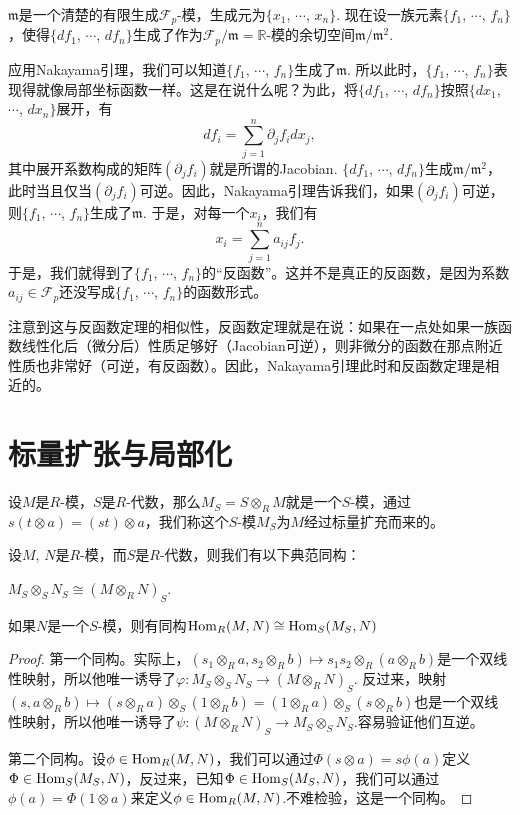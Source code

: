 $\mathfrak{m}$是一个清楚的有限生成$\mathcal{F}_p$-模，生成元为$\{x_1$, $\cdots$, $x_n\}$. 现在设一族元素$\{f_1$, $\cdots$, $f_n\}$，使得$\{df_1$, $\cdots$, $df_n\}$生成了作为$\mathcal{F}_p/\mathfrak{m}=\mathbb{R}$-模的余切空间$\mathfrak{m}/\mathfrak{m}^2$.

应用Nakayama引理，我们可以知道$\{f_1$, $\cdots$, $f_n\}$生成了$\mathfrak{m}$. 所以此时，$\{f_1$, $\cdots$, $f_n\}$表现得就像局部坐标函数一样。这是在说什么呢？为此，将$\{df_1$, $\cdots$, $df_n\}$按照$\{dx_1$, $\cdots$, $dx_n\}$展开，有
\[
	df_i=\sum_{j=1}^n\partial_jf_i dx_j,
\]
其中展开系数构成的矩阵$(\partial_jf_i)$就是所谓的Jacobian. $\{df_1$, $\cdots$, $df_n\}$生成$\mathfrak{m}/\mathfrak{m}^2$，此时当且仅当$(\partial_jf_i)$可逆。因此，Nakayama引理告诉我们，如果$(\partial_jf_i)$可逆，则$\{f_1$, $\cdots$, $f_n\}$生成了$\mathfrak{m}$. 于是，对每一个$x_i$，我们有
\[
	x_i=\sum_{j=1}^n a_{ij}f_j.
\]
于是，我们就得到了$\{f_1$, $\cdots$, $f_n\}$的“反函数”。这并不是真正的反函数，是因为系数$a_{ij}\in \mathcal{F}_p$还没写成$\{f_1$, $\cdots$, $f_n\}$的函数形式。

注意到这与反函数定理的相似性，反函数定理就是在说：如果在一点处如果一族函数线性化后（微分后）性质足够好（Jacobian可逆），则非微分的函数在那点附近性质也非常好（可逆，有反函数）。因此，Nakayama引理此时和反函数定理是相近的。

\section{标量扩张与局部化}

\para 设$M$是$R$-模，$S$是$R$-代数，那么$M_S=S\otimes_R M$就是一个$S$-模，通过$s(t\otimes a)=(st)\otimes a$，我们称这个$S$-模$M_S$为$M$经过标量扩充而来的。

\begin{lem}
设$M$, $N$是$R$-模，而$S$是$R$-代数，则我们有以下典范同构：
\begin{compactenum}[~~~(1)]
\item $M_S\otimes_S N_S\cong (M\otimes_R N)_S$.
\item 如果$N$是一个$S$-模，则有同构$\operatorname{Hom}_R(M,N)\cong \operatorname{Hom}_S(M_S,N)$
\end{compactenum}
\end{lem}

\begin{proof} 第一个同构。实际上，$(s_1\otimes_R a,s_2\otimes_R b)\mapsto s_1s_2\otimes_R(a\otimes_R b)$是一个双线性映射，所以他唯一诱导了$\varphi:M_S\otimes_S N_S\to (M\otimes_R N)_S$. 反过来，映射$(s,a\otimes_R b)\mapsto (s\otimes_R a)\otimes_S (1\otimes_R b)=(1\otimes_R a)\otimes_S (s\otimes_R b)$也是一个双线性映射，所以他唯一诱导了$\psi:(M\otimes_R N)_S\to M_S\otimes_S N_S$.容易验证他们互逆。

第二个同构。设$\phi\in \operatorname{Hom}_R(M,N)$，我们可以通过$\Phi(s\otimes a)=s\phi(a)$定义$\Phi\in \operatorname{Hom}_S(M_S,N)$，反过来，已知$\Phi\in \operatorname{Hom}_S(M_S,N)$，我们可以通过$\phi(a)=\Phi(1\otimes a)$来定义$\phi\in \operatorname{Hom}_R(M,N)$.不难检验，这是一个同构。 \end{proof}

